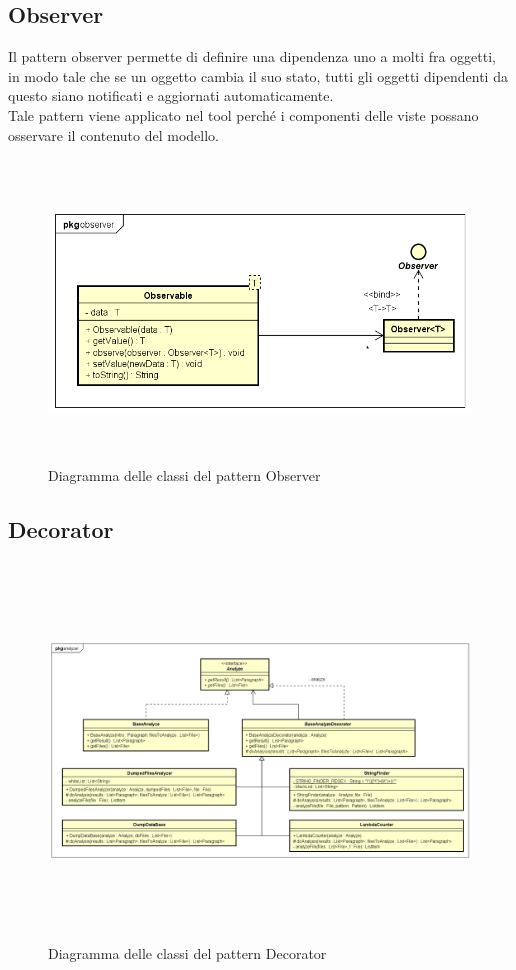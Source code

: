 \subsection{Observer}\label{subsec:observer}
Il pattern observer permette di definire una dipendenza uno a molti fra oggetti, in modo tale che se un oggetto cambia il suo stato, tutti gli oggetti dipendenti da questo siano notificati e aggiornati automaticamente.\\
Tale pattern viene applicato nel tool perché i componenti delle viste possano osservare il contenuto del modello.
\begin{figure}[H]
    \centering
    \includegraphics[width=14cm, height=8cm]{./immagini/diagrammi_uml/Observer.png}
    \caption{Diagramma delle classi del pattern Observer}\label{fig:observer}
\end{figure}
\subsection{Decorator}\label{subsec:decorator}
\begin{figure}[H]
    \centering
    \includegraphics[width=14cm, height=10cm]{./immagini/diagrammi_uml/Decorator.png}
    \caption{Diagramma delle classi del pattern Decorator}\label{fig:decorator}
\end{figure}

